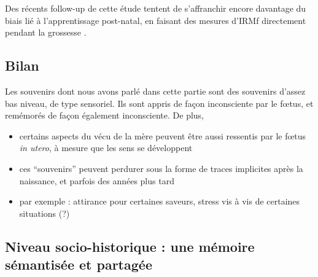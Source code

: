 \documentclass[french]{article}
\begin{document}
				Des récents follow-up de cette étude tentent de s'affranchir encore davantage du biais lié à l'apprentissage post-natal, en faisant des mesures d'IRMf directement pendant la grossesse \cite{jardri2012}. 
			\subsection{Bilan}
				Les souvenirs dont nous avons parlé dans cette partie sont des souvenirs d'assez bas niveau, de type sensoriel. Ils sont appris de façon inconsciente par le fœtus, et remémorés de façon également inconsciente.
				De plus, 
		\begin{itemize}
			\item certains aspects du vécu de la mère peuvent être aussi ressentis par le fœtus \textit{in utero}, à mesure que les sens se développent
			\item ces ``souvenirs'' peuvent perdurer sous la forme de traces implicites après la naissance, et parfois des années plus tard
			\item par exemple : attirance pour certaines saveurs, stress vis à vis de certaines situations (?)
		\end{itemize}
		\subsection{Niveau socio-historique : une mémoire sémantisée et partagée}
\end{document}
